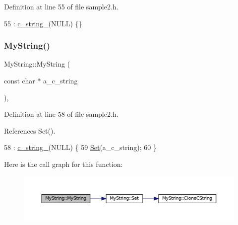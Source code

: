 Definition at line 55 of file sample2.\+h.


\begin{DoxyCode}
55 : \hyperlink{classMyString_a1872c0d04ff5f6e654161472b18bb9d0}{c\_string\_}(NULL) \{\}
\end{DoxyCode}
\mbox{\label{classMyString_a28134eb91b6698f46b12accefa157d0f}} 
\subsubsection{\texorpdfstring{My\+String()}{MyString()}\hspace{0.1cm}{\footnotesize\ttfamily [2/3]}}
{\footnotesize\ttfamily My\+String\+::\+My\+String (\begin{DoxyParamCaption}\item[{const char $\ast$}]{a\+\_\+c\+\_\+string }\end{DoxyParamCaption})\hspace{0.3cm}{\ttfamily [inline]}, {\ttfamily [explicit]}}



Definition at line 58 of file sample2.\+h.



References Set().


\begin{DoxyCode}
58                                             : \hyperlink{classMyString_a1872c0d04ff5f6e654161472b18bb9d0}{c\_string\_}(NULL) \{
59     \hyperlink{classMyString_a521c4cd7eccac6ce554d8a51505e4970}{Set}(a\_c\_string);
60   \}
\end{DoxyCode}
Here is the call graph for this function\+:
\nopagebreak
\begin{figure}[H]
\begin{center}
\leavevmode
\includegraphics[width=350pt]{classMyString_a28134eb91b6698f46b12accefa157d0f_cgraph}
\end{center}
\end{figure}
\mbox{\label{classMyString_ae24c7cf89a58dd2287303df2ac054c66}} 
